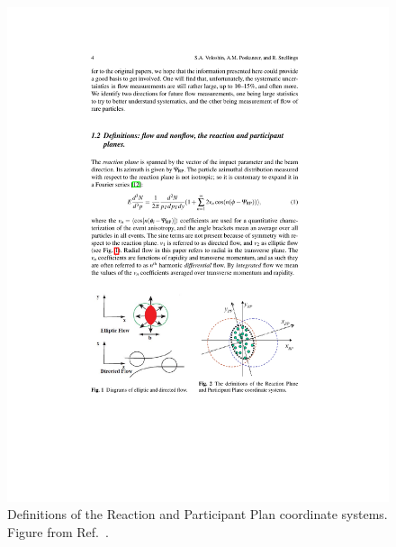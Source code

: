 \begin{figure}
\begin{center}
  \begin{minipage}[b]{0.45\textwidth}
\includegraphics[width=\textwidth]{figures/theory/reaction_plane}
\caption{Definitions of the Reaction and Participant Plan coordinate systems.
Figure from Ref.~\cite{Voloshin:2008dg}.}
\label{fig:reaction_plane}
  \end{minipage}
 \qquad
 \begin{minipage}[b]{0.45\textwidth}

\end{minipage}
\end{center}
\end{figure}

